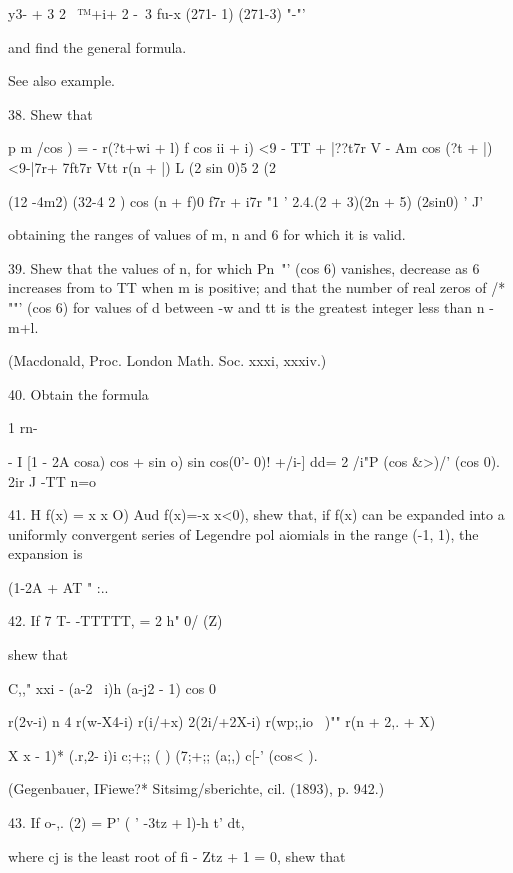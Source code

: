 {{{{y3- + 3 2 \ ™+i+ 2 -\ 3 fu-x (271- 1) (271-3) "-"'

and find the general formula.


See also example.

%
%

38. Shew that

p m /cos ) = - r(?t+wi + l) f cos ii + i) <9 - TT + |??t7r V - Am cos
(?t + |)<9-|7r+ 7ft7r Vtt r(n + |) L (2 sin 0)5 2 (2%

(12 -4m2) (32-4 2 ) cos (n + f)0 f7r + i7r "1 ' 2.4.(2 + 3)(2n + 5)
(2sin0) ' J'

obtaining the ranges of values of m, n and 6 for which it is valid.


39. Shew that the values of n, for which Pn~"' (cos 6) vanishes,
decrease as 6 increases from to TT when m is positive; and that the
number of real zeros of /* ""' (cos 6) for values of d between -w and
tt is the greatest integer less than n - m+l.

(Macdonald, Proc. London Math. Soc. xxxi, xxxiv.)

40. Obtain the formula

1 rn- \,

- I [1 - 2A cosa) cos + sin o) sin cos(0'- 0)! +/i-] dd= 2 /i"P (cos
\&>)/' (cos 0). 2ir J -TT n=o


41. H f(x) = x x O) Aud f(x)=-x x<0), shew that, if f(x) can be
expanded into a uniformly convergent series of Legendre pol aiomials
in the range (-1, 1), the expansion is

 (1-2A + AT " :..

42. If 7 T- -TTTTT, = 2 h" 0/ (Z)

shew that

C,," xxi - (a-2 \ i)h (a-j2 - 1) cos 0

  r(2v-i) n 4 r(w-X4-i) r(i/+x) 2(2i/+2X-i) r(wp;,io ~)"" r(n + 2,. +
X)

X x - 1)* (.r,2- i)i c;+;; ( ) (7;+;; (a;,) c[-' (cos< ).

(Gegenbauer, IFiewe?* Sitsimg/sberichte, cil. (1893), p. 942.)

43. If o-,. (2) = P' (  ' -3tz + l)-h t' dt,

where cj is the least root of fi - Ztz + 1 = 0, shew that

}}}}
